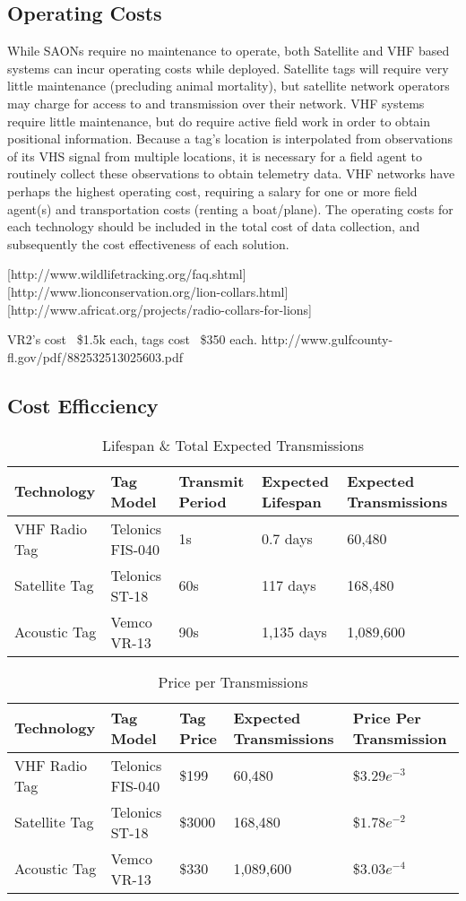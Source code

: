 \subsection{Operating Costs}
While SAONs require no maintenance to operate, both Satellite and VHF based systems can incur operating costs while deployed.  Satellite tags will require very little maintenance (precluding animal mortality), but satellite network operators may charge for access to and transmission over their network\cite{wildlifetracking}.  VHF systems require little maintenance, but do require active field work in order to obtain positional information.  Because a tag's location is interpolated from observations of its VHS signal from multiple locations, it is necessary for a field agent to routinely collect these observations to obtain telemetry data.  VHF networks have perhaps the highest operating cost, requiring a salary for one or more field agent(s) and transportation costs (renting a boat/plane).  The operating costs for each technology should be included in the total cost of data collection, and subsequently the cost effectiveness of each solution.
  
  
[http://www.wildlifetracking.org/faq.shtml]
[http://www.lionconservation.org/lion-collars.html]
[http://www.africat.org/projects/radio-collars-for-lions]

VR2's cost ~\$1.5k each, tags cost ~\$350 each.  http://www.gulfcounty-fl.gov/pdf/882532513025603.pdf 

\subsection{Cost Efficciency}
\begin{table}[h!]
	\label{ExpectedLife&Tx}
	\begin{tabular}{l l l l l}
		Technology&Tag Model&Transmit Period&Expected Lifespan&Expected Transmissions\\
		\hline
		VHF Radio Tag		& Telonics FIS-040	& 1s	& 0.7 days	    & 60,480\\
		Satellite Tag		& Telonics ST-18	& 60s	& 117 days		& 168,480\\
		Acoustic Tag		& Vemco VR-13		& 90s	& 1,135 days	& 1,089,600\\
	\end{tabular}
\caption{Lifespan \& Total Expected Transmissions}
\end{table}


\begin{table}[h!]
	\label{PricePerTx}
	\begin{tabular}{l l l l l}
		Technology&Tag Model&Tag Price&Expected Transmissions&Price Per Transmission\\
		\hline
		VHF Radio Tag		& Telonics FIS-040	& \$199		& 60,480	& \$$3.29e^{-3}$\\
		Satellite Tag		& Telonics ST-18	& \$3000	& 168,480	& \$$1.78e^{-2}$\\
		Acoustic Tag		& Vemco VR-13		& \$330		& 1,089,600	& \$$3.03e^{-4}$\\
	\end{tabular}
	\caption{Price per Transmissions}
\end{table}


